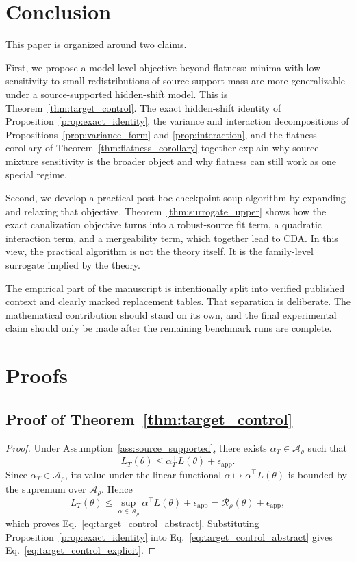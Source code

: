 \documentclass{article}
\theoremstyle{definition}
\newcommand{\cA}{\mathcal{A}}
\newcommand{\cda}{\textup{\textsc{CDA}}}
\begin{document}
\section{Conclusion}

This paper is organized around two claims.

First, we propose a model-level objective beyond flatness: minima with low sensitivity to small redistributions of source-support mass are more generalizable under a source-supported hidden-shift model. This is Theorem~\ref{thm:target_control}. The exact hidden-shift identity of Proposition~\ref{prop:exact_identity}, the variance and interaction decompositions of Propositions~\ref{prop:variance_form} and \ref{prop:interaction}, and the flatness corollary of Theorem~\ref{thm:flatness_corollary} together explain why source-mixture sensitivity is the broader object and why flatness can still work as one special regime.

Second, we develop a practical post-hoc checkpoint-soup algorithm by expanding and relaxing that objective. Theorem~\ref{thm:surrogate_upper} shows how the exact canalization objective turns into a robust-source fit term, a quadratic interaction term, and a mergeability term, which together lead to \cda{}. In this view, the practical algorithm is not the theory itself. It is the family-level surrogate implied by the theory.

The empirical part of the manuscript is intentionally split into verified published context and clearly marked replacement tables. That separation is deliberate. The mathematical contribution should stand on its own, and the final experimental claim should only be made after the remaining benchmark runs are complete.

\appendix

\section{Proofs}

\subsection{Proof of Theorem~\ref{thm:target_control}}

\begin{proof}
Under Assumption~\ref{ass:source_supported}, there exists \(\alpha_T\in \cA_\rho\) such that
\[
L_T(\theta)\le \alpha_T^\top L(\theta)+\epsilon_{\mathrm{app}}.
\]
Since \(\alpha_T\in \cA_\rho\), its value under the linear functional \(\alpha\mapsto \alpha^\top L(\theta)\) is bounded by the supremum over \(\cA_\rho\). Hence
\[
L_T(\theta)
\le
\sup_{\alpha\in\cA_\rho}\alpha^\top L(\theta)+\epsilon_{\mathrm{app}}
=
\mathcal R_\rho(\theta)+\epsilon_{\mathrm{app}},
\]
which proves Eq.~\eqref{eq:target_control_abstract}. Substituting Proposition~\ref{prop:exact_identity} into Eq.~\eqref{eq:target_control_abstract} gives Eq.~\eqref{eq:target_control_explicit}.
\end{proof}
\end{document}
